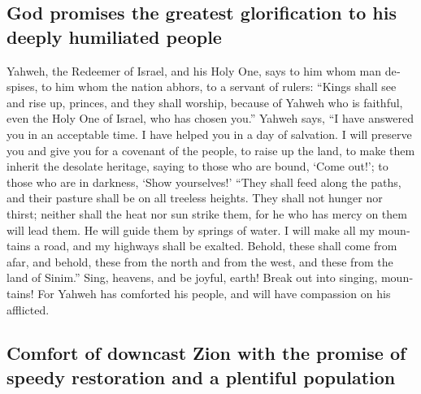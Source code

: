\begin{paracol}{2}
\begin{otherlanguage}{english}
{\subsection{God promises the greatest glorification to his deeply
humiliated
people}\label{god-promises-the-greatest-glorification-to-his-deeply-humiliated-people}}

 Yahweh, the Redeemer of Israel, and his Holy One, says to
him whom man despises, to him whom the nation abhors, to a servant of
rulers: ``Kings shall see and rise up, princes, and they shall worship,
because of Yahweh who is faithful, even the Holy One of Israel, who has
chosen you.''  Yahweh says, ``I have answered you in an
acceptable time. I have helped you in a day of salvation. I will
preserve you and give you for a covenant of the people, to raise up the
land, to make them inherit the desolate heritage,  saying
to those who are bound, `Come out!'; to those who are in darkness, `Show
yourselves!' ``They shall feed along the paths, and their pasture shall
be on all treeless heights.  They shall not hunger nor
thirst; neither shall the heat nor sun strike them, for he who has mercy
on them will lead them. He will guide them by springs of water.
 I will make all my mountains a road, and my highways
shall be exalted.  Behold, these shall come from afar,
and behold, these from the north and from the west, and these from the
land of Sinim.''  Sing, heavens, and be joyful, earth!
Break out into singing, mountains! For Yahweh has comforted his people,
and will have compassion on his afflicted.

\hypertarget{comfort-of-downcast-zion-with-the-promise-of-speedy-restoration-and-a-plentiful-population}{%
\subsection{Comfort of downcast Zion with the promise of speedy
restoration and a plentiful
population}\label{comfort-of-downcast-zion-with-the-promise-of-speedy-restoration-and-a-plentiful-population}}


\end{otherlanguage}
\end{paracol}
